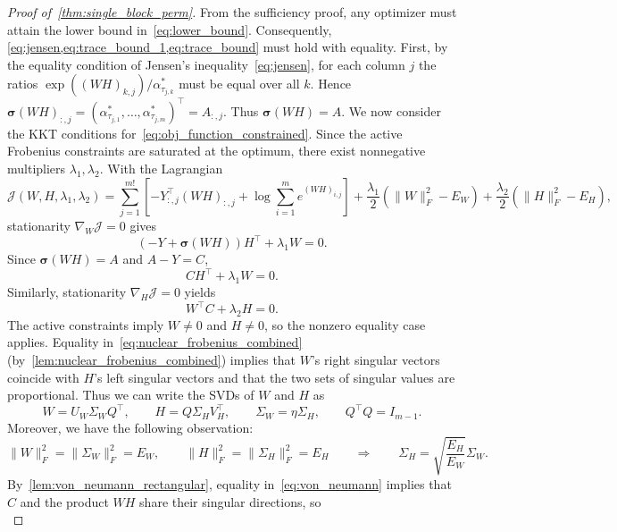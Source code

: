 \documentclass[11pt]{article}
\begin{document}
\begin{proof}[Proof of~\cref{thm:single_block_perm}]
From the sufficiency proof, any optimizer must attain the lower bound in~\cref{eq:lower_bound}. Consequently, \cref{eq:jensen,eq:trace_bound_1,eq:trace_bound} must hold with equality. First, by the equality condition of Jensen's inequality~\cref{eq:jensen}, for each column \(j\) the ratios \( \exp\left((WH)_{k,j}\right)/\alpha^*_{\tau_{j,k}} \) must be equal over all \(k\).  Hence \( \boldsymbol{\sigma}(WH)_{:,j}
=(\alpha^*_{\tau_{j,1}},\ldots,\alpha^*_{\tau_{j,m}})^\top=A_{:,j} \). Thus \(\boldsymbol{\sigma}(WH)=A\).  
We now consider the KKT conditions for~\cref{eq:obj_function_constrained}. Since the active Frobenius constraints are saturated at the optimum, there exist nonnegative multipliers \(\lambda_1,\lambda_2\).  
With the Lagrangian
\[
  \mathscr{J}(W,H,\lambda_1,\lambda_2)
  = \sum_{j=1}^{m!}\left[-Y_{:,j}^\top (WH)_{:,j}
      +\log \sum_{i=1}^m e^{(WH)_{i,j}}\right]
   + \frac{\lambda_1}2 \left(\|W\|_F^2-E_W\right) + \frac{\lambda_2}2 \left(\|H\|_F^2-E_H\right),
\]
stationarity $\nabla_W\mathscr{J}=0$ gives
\[
  (-Y + \boldsymbol{\sigma}(WH)) H^\top + \lambda_1 W = 0.
\]
Since $\boldsymbol{\sigma}(WH)=A$ and \(A-Y=C\),
\begin{equation}\label{eq:K1}
  C H^\top + \lambda_1 W = 0.
\end{equation}
Similarly, stationarity $\nabla_H\mathscr{J}=0$ yields
\begin{equation}\label{eq:K2}
  W^\top C + \lambda_2 H = 0.
\end{equation}
The active constraints imply \(W\neq 0\) and \(H\neq 0\), so the nonzero equality
case applies. Equality in~\cref{eq:nuclear_frobenius_combined} (by~\cref{lem:nuclear_frobenius_combined}) implies that \(W\)'s right singular vectors coincide with \(H\)'s left singular vectors and that the two sets of singular values are proportional. Thus we can write the SVDs of \(W\) and \(H\) as
\begin{equation}\label{eq:general_SVD}
  W = U_W \Sigma_W Q^\top,
  \qquad
  H = Q \Sigma_H V_H^\top,
  \qquad
  \Sigma_W = \eta \Sigma_H,
  \qquad
  Q^\top Q = I_{m-1}.
\end{equation}
Moreover, we have the following observation:
\[
\|W\|_F^2 = \|\Sigma_W\|_F^2 = E_W, \qquad
  \|H\|_F^2 = \|\Sigma_H\|_F^2 = E_H
\qquad\Longrightarrow\qquad
\Sigma_H = \sqrt{\frac{E_H}{E_W}}\Sigma_W.
\]
By~\cref{lem:von_neumann_rectangular}, equality in~\cref{eq:von_neumann}
implies that \(C\) and the product \(WH\) share their singular directions, so
\begin{equation}\label{eq:shared_singular}

\end{equation}
\end{proof}
\end{document}
